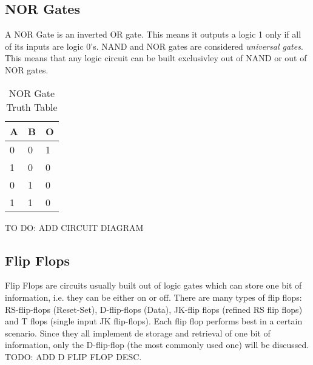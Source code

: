 \subsection{NOR Gates}
A NOR Gate is an inverted OR gate. This means it outputs a logic 1 only if all of its inputs are logic 0's.
NAND and NOR gates are considered \emph{universal gates}. This means that any logic circuit can be built exclusivley out of NAND or out of NOR gates.
\begin{table}[H]
\centering
\begin{tabular}{l|l|l}
\hline
\multicolumn{1}{|l|}{\textbf{A}} & \textbf{B} & \multicolumn{1}{l|}{\textbf{O}} \\ \hline
0                                & 0          & 1                               \\
1                                & 0          & 0                               \\
0                                & 1          & 0                               \\
1                                & 1          & 0
\end{tabular}
\caption{NOR Gate Truth Table}
\label{tab:nor-table}
\end{table}
TO DO: ADD CIRCUIT DIAGRAM

\subsection{Flip Flops}
Flip Flops are circuits usually built out of logic gates which can store one bit of information, i.e. they can be either on or off. There are many types of flip flops: RS-flip-flops (Reset-Set), D-flip-flops (Data), JK-flip flops (refined RS flip flops) and T flops (single input JK flip-flops). Each flip flop performs best in a certain scenario. Since they all implement de storage and retrieval of one bit of information, only the D-flip-flop (the most commonly used one) will be discussed. \\
TODO: ADD D FLIP FLOP DESC.
